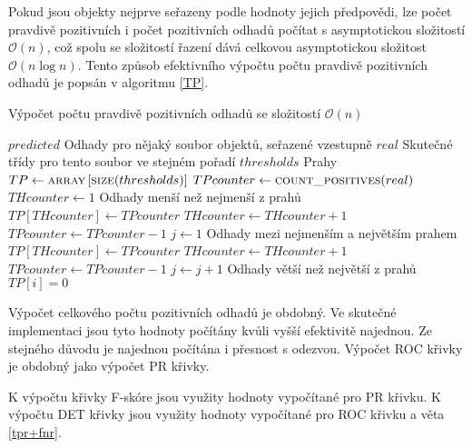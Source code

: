 Pokud jsou objekty nejprve seřazeny podle hodnoty jejich předpovědi, lze počet pravdivě pozitivních i počet pozitivních odhadů počítat s asymptotickou složitostí \( \mathcal O \left( n \right) \), což spolu se složitostí řazení dává celkovou asymptotickou složitost \( \mathcal O \left( n \log n \right) \). Tento způsob efektivního výpočtu počtu pravdivě pozitivních odhadů je popsán v algoritmu \ref{TP}.

\begin{algorithm}
	\caption{Výpočet počtu pravdivě pozitivních odhadů se složitostí \( \mathcal O \left( n \right) \)}
	\label{TP}
	\begin{algorithmic}
		\Require $ predicted $ \Comment Odhady pro nějaký soubor objektů, seřazené vzestupně
		\Require $ real $ \Comment Skutečné třídy pro tento soubor ve stejném pořadí
		\Require $ thresholds $ \Comment Prahy
		\Statex
		\State $ TP \gets \Call{array}{} \left[ \Call{size}{thresholds} \right] $
		\State $ TPcounter \gets \Call{count\_positives}{real} $
		\State $ THcounter \gets 1 $
		 \Comment Odhady menší než nejmenší z prahů
				\Break
			\EndIf
			\State $ TP \left[ THcounter \right] \gets TPcounter $
				\State $ THcounter \gets THcounter + 1 $
		\EndFor
			\State $ TPcounter \gets TPcounter - 1 $
		\EndIf
		\State $ j \gets 1 $
		 \Comment Odhady mezi nejmenším a největším prahem
				\State $ TP \left[ THcounter \right] \gets TPcounter $
				\State $ THcounter \gets THcounter + 1 $
			\Else
					\State $ TPcounter \gets TPcounter - 1 $
				\EndIf
				\State $ j \gets j + 1 $
			\EndIf
		\EndWhile
		 \Comment Odhady větší než největší z prahů
			\State $ TP \left[ i \right] = 0 $
		\EndFor
	\end{algorithmic}
\end{algorithm}

Výpočet celkového počtu pozitivních odhadů je obdobný. Ve skutečné implementaci jsou tyto hodnoty počítány kvůli vyšší efektivitě najednou. Ze stejného důvodu je najednou počítána i přesnost s odezvou. Výpočet ROC křivky je obdobný jako výpočet PR křivky.

K výpočtu křivky F-skóre jsou využity hodnoty vypočítané pro PR křivku. K výpočtu DET křivky jsou využity hodnoty vypočítané pro ROC křivku a věta \ref{tpr+fnr}.
